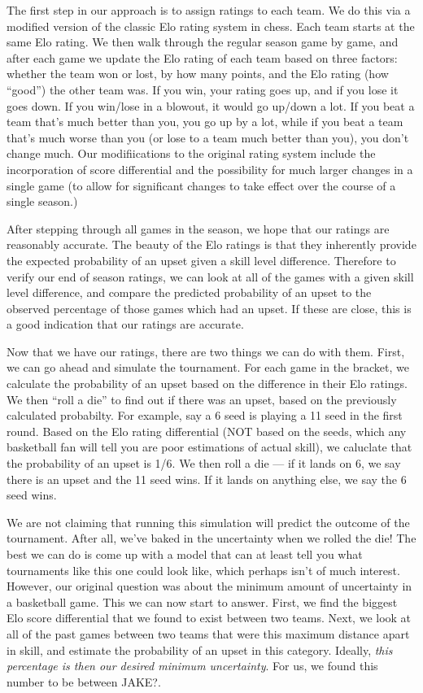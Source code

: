 \documentclass{article}
\begin{document}
The first step in our approach is to assign ratings to each team. We do this via a modified version of the classic Elo rating system in chess. Each team starts at the same Elo rating. We then walk through the regular season game by game, and after each game we update the Elo rating of each team based on three factors: whether the team won or lost, by how many points, and the Elo rating (how ``good'') the other team was. If you win, your rating goes up, and if you lose it goes down. If you win/lose in a blowout, it would go up/down a lot. If you beat a team that's much better than you, you go up by a lot, while if you beat a team that's much worse than you (or lose to a team much better than you), you don't change much. Our modifiications to the original rating system include the incorporation of score differential and the possibility for much larger changes in a single game (to allow for significant changes to take effect over the course of a single season.)

After stepping through all games in the season, we hope that our ratings are reasonably accurate. The beauty of the Elo ratings is that they inherently provide the expected probability of an upset given a skill level difference. Therefore to verify our end of season ratings, we can look at all of the games with a given skill level difference, and compare the predicted probability of an upset to the observed percentage of those games which had an upset. If these are close, this is a good indication that our ratings are accurate.

Now that we have our ratings, there are two things we can do with them. First, we can go ahead and simulate the tournament. For each game in the bracket, we calculate the probability of an upset based on the difference in their Elo ratings. We then ``roll a die'' to find out if there was an upset, based on the previously calculated probabilty. For example, say a 6 seed is playing a 11 seed in the first round. Based on the Elo rating differential (NOT based on the seeds, which any basketball fan will tell you are poor estimations of actual skill), we caluclate that the probability of an upset is 1/6. We then roll a die --- if it lands on 6, we say there is an upset and the 11 seed wins. If it lands on anything else, we say the 6 seed wins.

We are not claiming that running this simulation will predict the outcome of the tournament. After all, we've baked in the uncertainty when we rolled the die! The best we can do is come up with a model that can at least tell you what tournaments like this one could look like, which perhaps isn't of much interest. However, our original question was about the minimum amount of uncertainty in a basketball game. This we can now start to answer. First, we find the biggest Elo score differential that we found to exist between two teams. Next, we look at all of the past games between two teams that were this maximum distance apart in skill, and estimate the probability of an upset in this category. Ideally, \textit{this percentage is then our desired minimum uncertainty}. For us, we found this number to be between JAKE?\@. 
\end{document}
